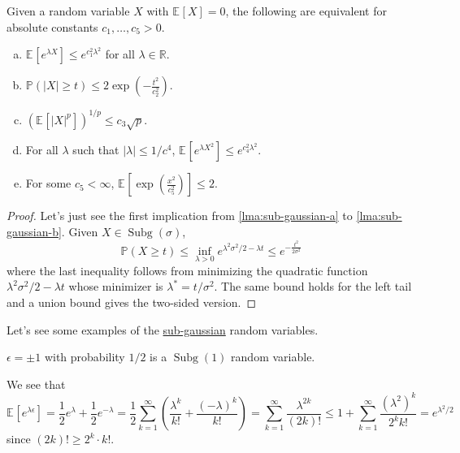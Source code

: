 \begin{lemma}\label{lma:sub-gaussian}
	Given a random variable \(X\) with \(\mathbb{E}_{}\left[X \right] =0\), the following are equivalent for absolute constants \(c_1, \dots , c_5 > 0\).
	\begin{enumerate}[(a)]
		\item\label{lma:sub-gaussian-a} \(\mathbb{E}_{}\left[e^{\lambda X} \right] \leq e^{c_1^2 \lambda ^2}\) for all \(\lambda \in \mathbb{R} \).
		\item\label{lma:sub-gaussian-b} \(\mathbb{P} (\vert X \vert \geq t) \leq 2 \exp \left( - \frac{t^2}{c_2^2} \right) \).
		\item\label{lma:sub-gaussian-c} \(\left( \mathbb{E}_{}\left[\vert X \vert ^p \right]  \right)^{1 / p} \leq c_3 \sqrt{p}  \).
		\item\label{lma:sub-gaussian-d} For all \(\lambda \) such that \(\vert \lambda  \vert \leq 1 / c^4 \), \(\mathbb{E}_{}\left[e^{\lambda X^2} \right] \leq e^{c_4^2 \lambda ^2} \).
		\item\label{lma:sub-gaussian-e} For some \(c_5 < \infty \), \(\mathbb{E}_{}\left[\exp \left( \frac{x^2}{c_5^2} \right)  \right] \leq 2\).
	\end{enumerate}
\end{lemma}
\begin{proof}
	Let's just see the first implication from \autoref{lma:sub-gaussian-a} to \autoref{lma:sub-gaussian-b}. Given \(X \in \mathop{\mathrm{Subg}}(\sigma ) \),
	\[
		\mathbb{P} (X\geq t) \leq \inf _{\lambda > 0} e^{\lambda ^2 \sigma ^2 / 2 - \lambda t} \leq e^{-\frac{t^2}{2\sigma ^2}}
	\]
	where the last inequality follows from minimizing the quadratic function \(\lambda ^{2} \sigma ^{2} / 2 - \lambda t\) whose minimizer is \(\lambda ^{\ast} = t / \sigma ^{2} \). The same bound holds for the left tail and a union bound gives the two-sided version.
\end{proof}

Let's see some examples of the \hyperref[def:sub-gaussian]{sub-gaussian} random variables.

\begin{eg}\label{eg:Rademacher-random-varaible}
	\(\epsilon = \pm 1\) with probability \(1 / 2\) is a \(\mathop{\mathrm{Subg}}(1) \) random variable.
\end{eg}
\begin{explanation}
	We see that
	\[
		\mathbb{E}_{}\left[e^{\lambda \epsilon } \right]
		= \frac{1}{2} e^\lambda + \frac{1}{2} e^{-\lambda }
		= \frac{1}{2} \sum_{k=1}^{\infty} \left( \frac{\lambda ^k}{k!} + \frac{(-\lambda )^k}{k!} \right)
		= \sum_{k=1}^{\infty} \frac{\lambda ^{2k}}{(2k)!}
		\leq 1 + \sum_{k=1}^{\infty} \frac{(\lambda ^2)^k}{2^k k!}
		= e^{\lambda ^2 / 2}
	\]
	since \((2k)! \geq 2^k \cdot k!\).
\end{explanation}

